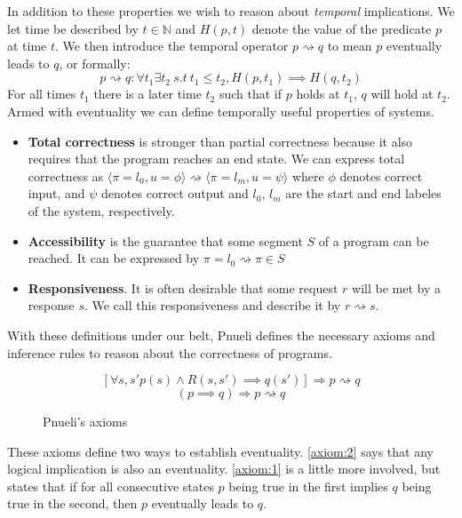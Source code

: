 \documentclass{uit-thesis}
\newcommand{\N}{\mathbb{N}}
\newcommand{\eventually}{\rightsquigarrow}
\begin{document}
In addition to these properties we wish to reason about \textit{temporal} implications. We let time be described by $t \in \N$ and $H(p,t)$ denote the value of the predicate $p$ at time $t$.
We then introduce the temporal operator $p \eventually q$ to mean $p$ eventually leads to $q$, or formally:
$$p \eventually q: \forall t_1 \exists t_2\ s.t\ t_1 \le t_2,  H(p, t_1) \implies H(q, t_2)$$
For all times $t_1$ there is a later time $t_2$ such that if $p$ holds at $t_1$, $q$ will hold at $t_2$.
Armed with eventuality we can define temporally useful properties of systems.
\begin{itemize}[label={}]
    \item \textbf{Total correctness} is stronger than partial correctness because it also requires that the program reaches an end state. We can express total correctness as $\langle \pi = l_0, u = \phi\rangle \eventually \langle \pi = l_m, u = \psi\rangle$ where $\phi$ denotes correct input, and $\psi$ denotes correct output and $l_0$, $l_m$ are the start and end labeles of the system, respectively.
    \item \textbf{Accessibility} is the guarantee that some segment $S$ of a program can be reached. It can be expressed by $\pi = l_0 \eventually \pi \in S$
    \item \textbf{Responsiveness}. It is often desirable that some request $r$ will be met by a response $s$. We call this responsiveness and describe it by $r \eventually s$.
\end{itemize}

With these definitions under our belt, Pnueli defines the necessary axioms and inference rules to reason about the correctness of programs.

\begin{figure}[h!]
    \begin{equation}\tag{A1}\label{axiom:1}
        [\forall s, s' p(s) \land R(s,s') \implies q(s')] \Rightarrow p \eventually q
    \end{equation}
    \begin{equation}\tag{A2}\label{axiom:2}
        (p \implies q) \Rightarrow p \eventually q
    \end{equation}
\caption{Pnueli's axioms}
\end{figure}

These axioms define two ways to establish eventuality. \ref{axiom:2} says that any logical implication is also an eventuality. \ref{axiom:1} is a little more involved, but states that if for all consecutive states $p$ being true in the first implies $q$ being true in the second, then $p$ eventually leads to $q$.
\end{document}
